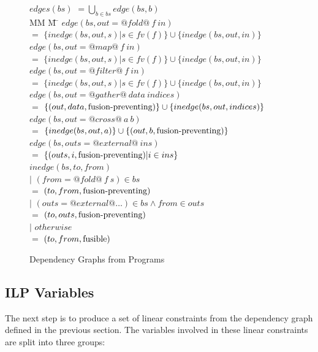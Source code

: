 \begin{figure}
\begin{tabbing}
$edges(bs)$ \> $= \bigcup_{b \in bs}edge(bs, b)$    
\\[1ex]
MM             \= M \= \kill
$edge(bs, out = @fold@~f~in)$ \\
    \> $=$    \> $\{inedge(bs,out,s) | s \in fv(f)\} \cup \{inedge(bs, out, in) \}$       \\
$edge(bs, out = @map@~f~in)$  \\
    \> $=$    \> $\{inedge(bs,out,s) | s \in fv(f)\} \cup \{inedge(bs, out, in) \}$       \\
$edge(bs, out = @filter@~f~in)$  \\
    \> $=$    \> $\{inedge(bs,out,s) | s \in fv(f)\} \cup \{inedge(bs, out, in) \}$       \\
$edge(bs, out = @gather@~data~indices)$  \\
    \> $=$    \> $\{(out,data, \mbox{fusion-preventing}) \} \cup \{inedge(bs, out, indices) \}$       \\
$edge(bs, out = @cross@~a~b)$            \\
    \> $=$    \> $\{inedge(bs, out, a) \}           \cup      \{(out, b, \mbox{fusion-preventing}) \}$ \\
$edge(bs, outs = @external@~ins)$  \\
    \> $=$    \> $\{(outs,i, \mbox{fusion-preventing}) | i \in ins \}$ 
\\[1ex]
$inedge(bs,to,from)$ \\
    \> $|$ \> $(from = @fold@~f~s) \in bs$     \\
    \> $=$ \> $(to, from, \mbox{fusion-preventing})$  \\
    \> $|$ \> $(outs = @external@ \ldots) \in bs     \wedge from \in outs$     \\
    \> $=$ \> $(to, outs, \mbox{fusion-preventing})$  \\
    \> $|$ \> $otherwise$                      \\
    \> $=$ \> $(to, from, \mathrm{fusible})$
\end{tabbing}

\caption{Dependency Graphs from Programs}
\label{f:DependencyGraph}
\end{figure}


\subsection{ILP Variables}
The next step is to produce a set of linear constraints from the dependency graph defined in the previous section. The variables involved in these linear constraints are split into three groups:

